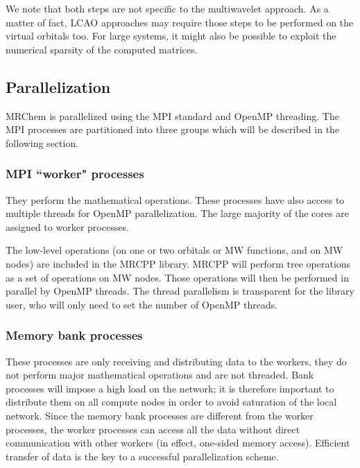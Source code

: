\documentclass[journal=jctcce, manuscript=article]{achemso}
\begin{document}
We note that both steps are not specific to the multiwavelet approach. As a matter of fact, \ac{LCAO} approaches may require those steps to be performed on the virtual orbitals too. For large systems, it might also be possible to exploit the numerical sparsity of the computed matrices.


\subsection{Parallelization}

MRChem is parallelized using the \ac{MPI} standard\cite{Pacheco1997-qq,Gropp2014-dz,Gropp2014-qf} and OpenMP threading.\cite{Mattson2019-gl,Van_der_Pas2017-wq}
The MPI processes are partitioned into three groups which will be described in the following section.

\subsubsection{MPI ``worker" processes} 
They perform the mathematical operations. These processes have also access to multiple threads for OpenMP parallelization. The large majority of the cores are assigned to worker processes.

The low-level operations (on one or two orbitals or \ac{MW} functions, and on \ac{MW} nodes) are included  in the MRCPP library. MRCPP will perform tree operations as a set of operations on \ac{MW} nodes. Those operations will then be performed in parallel by OpenMP threads. The thread parallelism is transparent for the library user, who will only need to set the number of OpenMP threads.

\subsubsection{Memory bank processes} 
These processes are only receiving and distributing data to the workers, they do not perform major mathematical operations and are not threaded. Bank processes will impose a high load on the network; it is therefore important to distribute them on all compute nodes in order to avoid saturation of the local network. Since the memory bank processes are different from the worker processes, the worker processes can access all the data without direct communication with other workers (in effect, one-sided memory access). Efficient transfer of data is the key to a successful parallelization scheme.
\end{document}
